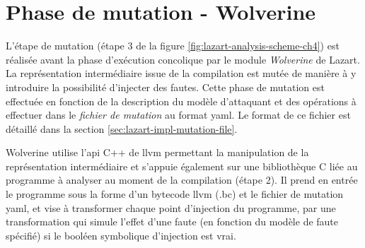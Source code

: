     \section{Phase de mutation - Wolverine}
    \label{sec:lazart-impl-wolv}
    
        L'étape de mutation (étape 3 de la figure \ref{fig:lazart-analysis-scheme-ch4}) est réalisée avant la phase d'exécution concolique par le module \textit{Wolverine} de Lazart. La représentation intermédiaire issue de la compilation est mutée de manière à y introduire la possibilité d'injecter des fautes.
        Cette phase de mutation est effectuée en fonction de la description du modèle d'attaquant et des opérations à effectuer dans le \textit{fichier de mutation} au format \gls{yaml}.
        Le format de ce fichier est détaillé dans la section \ref{sec:lazart-impl-mutation-file}. 
        
        Wolverine utilise l'\gls{api} C++ de \gls{llvm} permettant la manipulation de la représentation intermédiaire et s'appuie également sur une bibliothèque C liée au programme à analyser au moment de la compilation (étape 2). Il prend en entrée le programme sous la forme d'un bytecode \gls{llvm} (.bc) et le fichier de mutation \gls{yaml}, et vise à transformer chaque point d'injection du programme, par une transformation qui simule l'effet d'une faute (en fonction du modèle de faute spécifié) si le booléen symbolique d'injection est vrai. 
        
